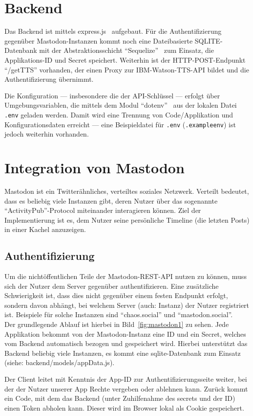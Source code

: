 \documentclass[fleqn,10pt]{SelfArx} %
\begin{document}
\section{Backend}
Das Backend ist mittels express.js~\cite{express} aufgebaut. Für die Authentifizierung gegenüber Mastodon-Instanzen kommt noch eine Dateibasierte SQLITE-Datenbank mit der Abstraktionsschicht \enquote{Sequelize}~\cite{sequelize} zum Einsatz, die Applikations-ID und Secret speichert. Weiterhin ist der HTTP-POST-Endpunkt \enquote{/getTTS} vorhanden, der einen Proxy zur IBM-Watson-TTS-API bildet und die Authentifizierung übernimmt.

Die Konfiguration --- insbesondere die der API-Schlüssel --- erfolgt über Umgebungsvariablen, die mittels dem Modul \enquote{dotenv}~\cite{dotenv} aus der lokalen Datei \texttt{.env} geladen werden. Damit wird eine Trennung von Code/Applikation und Konfigurationsdaten erreicht --- eine Beispieldatei für \texttt{.env} (\texttt{.exampleenv}) ist jedoch weiterhin vorhanden.
\section{Integration von Mastodon}
Mastodon ist ein Twitterähnliches, verteiltes soziales Netzwerk. Verteilt bedeutet, dass es beliebig viele Instanzen gibt, deren Nutzer über das sogenannte \enquote{ActivityPub}-Protocol miteinander interagieren können. Ziel der Implementierung ist es, dem Nutzer seine persönliche Timeline (die letzten Posts) in einer Kachel anzuzeigen.
\subsection{Authentifizierung}
Um die nichtöffentlichen Teile der Mastodon-REST-API nutzen zu können, muss sich der Nutzer dem Server gegenüber authentifizieren. Eine zusätzliche Schwierigkeit ist, dass dies nicht gegenüber einem festen Endpunkt erfolgt, sondern davon abhängt, bei welchem Server (auch: Instanz) der Nutzer registriert ist. Beispiele für solche Instanzen sind \enquote{chaos.social} und \enquote{mastodon.social}. \\
Der grundlegende Ablauf ist hierbei in Bild~\ref{fig:mastodon1} zu sehen. Jede Applikation bekommt von der Mastodon-Instanz eine ID und ein Secret, welches vom Backend automatisch bezogen und gespeichert wird. Hierbei unterstützt das Backend beliebig viele Instanzen, es kommt eine sqlite-Datenbank zum Einsatz (siehe: backend/models/appData.js).

Der Client leitet mit Kenntnis der App-ID zur Authentifizierungsseite weiter, bei der der Nutzer unserer App Rechte vergeben oder ablehnen kann. Zurück kommt ein Code, mit dem das Backend (unter Zuhilfenahme des secrets und der ID) einen Token abholen kann. Dieser wird im Browser lokal als Cookie gespeichert.
\end{document}
